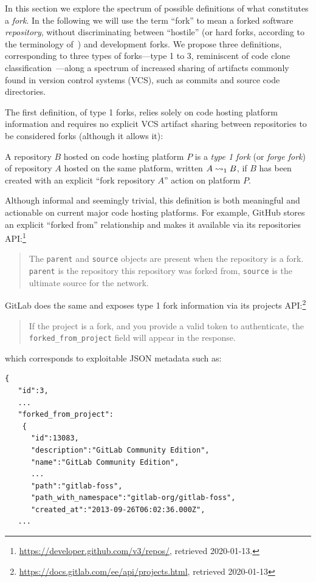 In this section we explore the spectrum of possible definitions of what
constitutes a \emph{fork}. In the following we will use the term ``fork'' to
mean a forked software \emph{repository}, without discriminating between
``hostile'' (or hard forks, according to the terminology
of~\cite{zhou2019fork}) and development forks. We propose three definitions,
corresponding to three types of forks---type 1 to 3, reminiscent of code clone
classification~\cite{roy2007clonedetectionsurvey,
  rattan2013clonedetectionreview}---along a spectrum of increased sharing of
artifacts commonly found in version control systems (VCS), such as commits and
source code directories.

The first definition, of type 1 forks, relies solely on code hosting platform
information and requires no explicit VCS artifact sharing between repositories
to be considered forks (although it allows it):
\begin{definition}
  \label{def:forge-fork}
  \label{def:type1-fork}
  A repository $B$ hosted on code hosting platform $P$ is a \emph{type 1 fork}
  (or \emph{forge fork}) of repository $A$ hosted on the same platform, written
  $A\rightsquigarrow_1 B$, if $B$ has been created with an explicit ``fork repository
  $A$'' action on platform $P$.
\end{definition}

Although informal and seemingly trivial, this definition is both meaningful and
actionable on current major code hosting platforms. For example, GitHub stores
an explicit ``forked from'' relationship and makes it available via its
repositories API:\footnote{\url{https://developer.github.com/v3/repos/},
  retrieved 2020-01-13.}
\begin{quote}
  The \texttt{parent} and \texttt{source} objects are present when the
  repository is a fork. \texttt{parent} is the repository this repository was
  forked from, \texttt{source} is the ultimate source for the network.
\end{quote}
GitLab does the same and exposes type 1 fork information via its projects
API:\footnote{\url{https://docs.gitlab.com/ee/api/projects.html}, retrieved
  2020-01-13}
\begin{quote}
  If the project is a fork, and you provide a valid token to authenticate, the
  \texttt{forked\_from\_project} field will appear in the response.
\end{quote}
which corresponds to exploitable JSON metadata such as:

\begin{minipage}{0.96\linewidth}
\begin{verbatim}
{
   "id":3,
   ...
   "forked_from_project":
    {
      "id":13083,
      "description":"GitLab Community Edition",
      "name":"GitLab Community Edition",
      ...
      "path":"gitlab-foss",
      "path_with_namespace":"gitlab-org/gitlab-foss",
      "created_at":"2013-09-26T06:02:36.000Z",
   ...
\end{verbatim}
\end{minipage}

